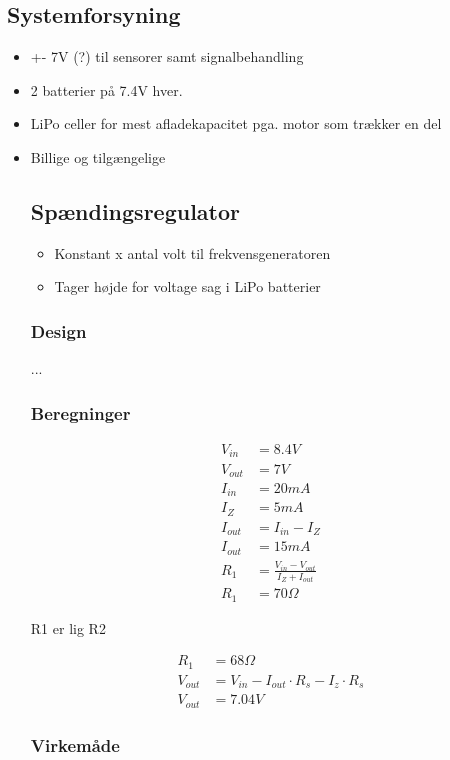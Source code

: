 \subsection{Systemforsyning}
\begin{itemize}
	\item +- 7V (?) til sensorer samt signalbehandling
	\item 2 batterier på 7.4V hver. 
	\item LiPo celler for mest afladekapacitet pga. motor som trækker en del
	\item Billige og tilgængelige
	
\subsection{Spændingsregulator}
\begin{itemize}
	\item Konstant x antal volt til frekvensgeneratoren
	\item Tager højde for voltage sag i LiPo batterier
\end{itemize}

	
	\subsubsection{Design}
	...
	
	\subsubsection{Beregninger}
	
	
	\begin{equation}
	\label{eq:RegulatorDesign}
	\begin{split}
	V_{in} & = 8.4V \\
	V_{out} & = 7V \\
	I_{in} & = 20mA \\
	I_Z & = 5mA \\
	I_{out} & = I_{in} - I_Z \\
	I_{out} & = 15mA \\
	R_1 & = \frac{V_{in} - V_{out}}{I_Z + I_{out}} \\
	R_1 & = 70 \Omega 
	\end{split}
	\end{equation}
	
	R1 er lig R2
	
	\begin{equation}
	\label{eq:RegulatorDesignTilnaermelse}
	\begin{split}
	R_1 & = 68 \Omega \\
	V_{out} & = V_{in} - I_{out} \cdot R_s - I_z \cdot R_s \\
	V_{out} & = 7.04V
	\end{split}
	\end{equation}
	
	\subsubsection{Virkemåde}
\end{itemize}


